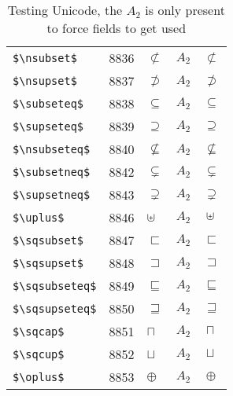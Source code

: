 \documentclass{article}
\begin{document}
\begin{table}
\begin{center}
\begin{tabular}{llll}
 \verb#$\nsubset$#     & 8836    & $\nsubset$     & $A_2\quad \nsubset$\\
 \verb#$\nsupset$#     & 8837    & $\nsupset$     & $A_2\quad \nsupset$\\
 \verb#$\subseteq$#    & 8838    & $\subseteq$    & $A_2\quad \subseteq$\\
 \verb#$\supseteq$#    & 8839    & $\supseteq$    & $A_2\quad \supseteq$\\
 \verb#$\nsubseteq$#   & 8840    & $\nsubseteq$   & $A_2\quad \nsubseteq$\\
 \verb#$\subsetneq$#   & 8842    & $\subsetneq$   & $A_2\quad \subsetneq$\\
 \verb#$\supsetneq$#   & 8843    & $\supsetneq$   & $A_2\quad \supsetneq$\\
 \verb#$\uplus$#       & 8846    & $\uplus$       & $A_2\quad \uplus$\\
 \verb#$\sqsubset$#    & 8847    & $\sqsubset$    & $A_2\quad \sqsubset$\\
 \verb#$\sqsupset$#    & 8848    & $\sqsupset$    & $A_2\quad \sqsupset$\\
 \verb#$\sqsubseteq$#  & 8849    & $\sqsubseteq$  & $A_2\quad \sqsubseteq$\\
 \verb#$\sqsupseteq$#  & 8850    & $\sqsupseteq$  & $A_2\quad \sqsupseteq$\\
 \verb#$\sqcap$#       & 8851    & $\sqcap$       & $A_2\quad \sqcap$\\
 \verb#$\sqcup$#       & 8852    & $\sqcup$       & $A_2\quad \sqcup$\\
 \verb#$\oplus$#       & 8853    & $\oplus$       & $A_2\quad \oplus$\\
\end{tabular}
\end{center}
\caption{Testing Unicode, the $A_2$ is only present to force fields to get used}
\end{table}
\clearpage
\end{document}
